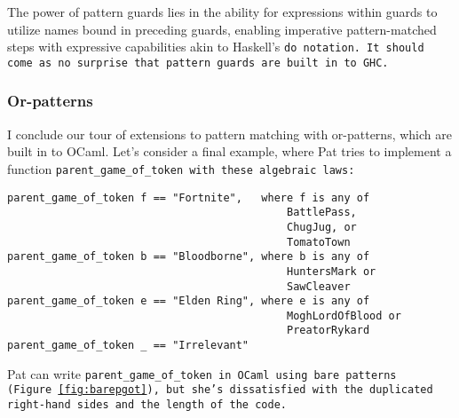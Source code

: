 \documentclass[manuscript,screen,review, 12pt]{acmart}
\begin{document}
    The power of pattern guards lies in the ability for expressions within
    guards to utilize names bound in preceding guards, enabling imperative
    pattern-matched steps with expressive capabilities akin to Haskell's \tt{do}
    notation. It should come as no surprise that pattern guards are built in to
    GHC. 

        

\subsubsection{Or-patterns}

        I conclude our tour of extensions to pattern matching with or-patterns,
        which are built in to OCaml. Let's consider a final example, where Pat
        tries to implement a function \tt{parent\_game\_of\_token} with these 
        algebraic laws: 

        \begin{minipage}[t]{\textwidth}
            \centering 
            \begin{verbatim}
parent_game_of_token f == "Fortnite",   where f is any of 
                                            BattlePass, 
                                            ChugJug, or
                                            TomatoTown
parent_game_of_token b == "Bloodborne", where b is any of 
                                            HuntersMark or 
                                            SawCleaver
parent_game_of_token e == "Elden Ring", where e is any of 
                                            MoghLordOfBlood or  
                                            PreatorRykard 
parent_game_of_token _ == "Irrelevant"
                                        \end{verbatim}
        \end{minipage}
    

        
        
        Pat can write \tt{parent\_game\_of\_token} in OCaml using bare patterns
        (Figure~\ref{fig:barepgot}), but she's dissatisfied with the duplicated
        right-hand sides and the length of the code. 
        
\end{document}
